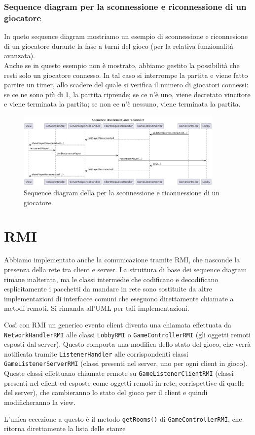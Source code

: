 \documentclass[12pt]{article}
\begin{document}
\subsubsection{Sequence diagram per la sconnessione e riconnessione di un giocatore}
In queto sequence diagram mostriamo un esempio di sconnessione e riconnesione di un giocatore durante la fase a turni del gioco (per la relativa funzionalità avanzata).
\\
Anche se in questo esempio non è mostrato, abbiamo gestito la possibilità che resti solo un giocatore connesso. In tal caso si interrompe la partita e viene fatto partire un timer, allo scadere del quale si verifica il numero di giocatori connessi: se ce ne sono più di 1, la partita riprende; se ce n'è uno, viene decretato vincitore e viene terminata la partita; se non ce n'è nessuno, viene terminata la partita.
\begin{figure}[H]
  \centering
  \includegraphics[width=0.9\textwidth]{img/sequenceDisconnectReconnectDetailed.png}
  \caption{Sequence diagram della per la sconnessione e riconnessione di un giocatore.}
  \label{fig:sequenceTillTheEnd}
\end{figure}

\section{RMI}
Abbiamo implementato anche la comunicazione tramite RMI, che nasconde la presenza della rete tra client e server. La struttura di base dei sequence diagram rimane inalterata, ma le classi intermedie che codificano e decodificano esplicitamente i pacchetti da mandare in rete sono sostituite da altre implementazioni di interfacce comuni che eseguono direttamente chiamate a metodi remoti. Si rimanda all'UML per tali implementazioni.

Così con RMI un generico evento client diventa una chiamata effettuata da \texttt{NetworkHandlerRMI} alle classi \texttt{LobbyRMI} o \texttt{GameControllerRMI} (gli oggetti remoti esposti dal server). Questo comporta una modifica dello stato del gioco, che verrà notificata tramite \texttt{ListenerHandler} alle corrispondenti classi \texttt{GameListenerServerRMI} (classi presenti nel server, uno per ogni client in gioco). Queste classi effettuano chiamate remote su \texttt{GameListenerClientRMI} (classi presenti nel client ed esposte come oggetti remoti in rete, corrispettive di quelle del server), che cambieranno lo stato del gioco per il client e quindi modificheranno la view.

L'unica eccezione a questo è il metodo \texttt{getRooms()} di \texttt{GameControllerRMI}, che ritorna direttamente la lista delle stanze
\end{document}
